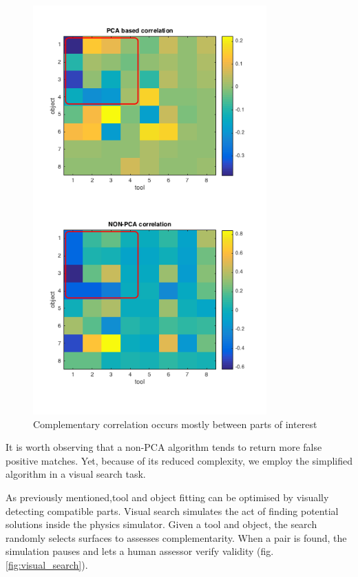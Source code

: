 \documentclass[
    floatsintext
]{article}
\begin{document}
\begin{figure}[!h]
  \centering
  \includegraphics[width=0.8\textwidth]{./figures/correlation_comparison.png}
  \caption{Complementary correlation occurs mostly between parts of interest}
  \label{fig:correlation_parts}
\end{figure}  

It is worth observing that a non-PCA algorithm tends to return more false positive matches. 
Yet, because of its reduced complexity, we employ the simplified algorithm in a visual search task.

As previously mentioned,tool and object fitting can be optimised by visually detecting compatible parts.  
Visual search simulates the act of finding potential solutions inside the physics simulator.
Given a tool and object, the search randomly selects surfaces to assesses complementarity.
When a pair is found, the simulation pauses and lets a human assessor verify validity (fig. \ref{fig:visual_search}). 
\end{document}
